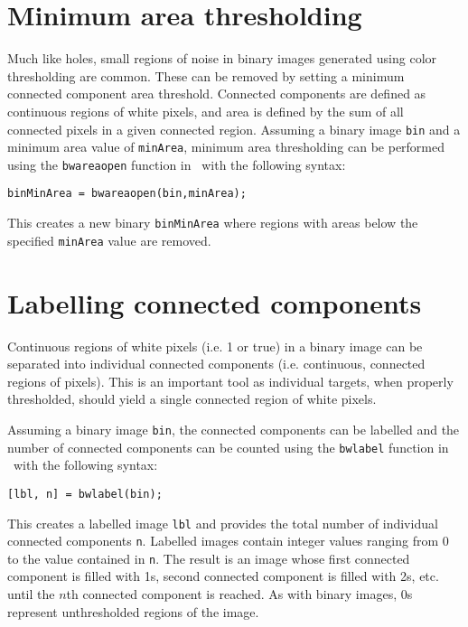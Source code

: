 \documentclass{tufte-handout}
\begin{document}
\section{Minimum area thresholding}
Much like holes, small regions of noise in binary images generated using color thresholding are common. These can be removed by setting a minimum connected component area threshold. Connected components are defined as continuous regions of white pixels, and area is defined by the sum of all connected pixels in a given connected region. Assuming a binary image \lstinline{bin} and a minimum area value of \lstinline{minArea}, minimum area thresholding can be performed using the \lstinline{bwareaopen} function in \Matlab\ with the following syntax:
\begin{lstlisting}[style=usnaMatlab]
binMinArea = bwareaopen(bin,minArea);
\end{lstlisting}
This creates a new binary \lstinline{binMinArea} where regions with areas below the specified \lstinline{minArea} value are removed.

\section{Labelling connected components}
Continuous regions of white pixels (i.e. 1 or true) in a binary image can be separated into individual connected components (i.e. continuous, connected regions of pixels). This is an important tool as individual targets, when properly thresholded, should yield a single connected region of white pixels. 

Assuming a binary image \lstinline{bin}, the connected components can be labelled and the number of connected components can be counted using the \lstinline{bwlabel} function in \Matlab\ with the following syntax:
\begin{lstlisting}[style=usnaMatlab]
[lbl, n] = bwlabel(bin);
\end{lstlisting}
This creates a labelled image \lstinline{lbl} and provides the total number of individual connected components \lstinline{n}. Labelled images contain integer values ranging from 0 to the value contained in \lstinline{n}. The result is an image whose first connected component is filled with 1s, second connected component is filled with 2s, etc. until the $n$th connected component is reached. As with binary images, 0s represent unthresholded regions of the image.
\end{document}
